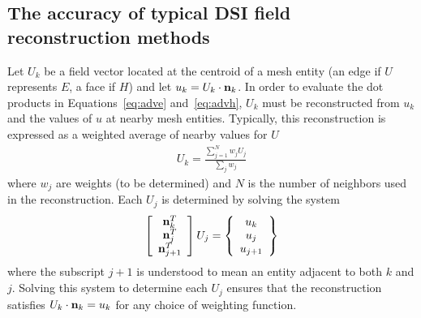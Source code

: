 \documentclass[12pt]{article}
\begin{document}
\subsection{The accuracy of typical DSI field reconstruction methods}
Let $U_k$ be a field vector located at the centroid of a mesh entity
(an edge if $U$ represents $E$, a face if $H$) and let $u_k=U_k\cdot{\bf
n}_k$.  In order to evaluate the dot products in
Equations~\ref{eq:adve} and~\ref{eq:advh}, $U_k$ must be reconstructed
from $u_k$ and the values of $u$ at nearby mesh entities.  Typically, this reconstruction
is expressed as a weighted average of nearby values for $U$ ~\cite{madsen,gedney}
\begin{eqnarray}
U_k = \frac{\sum_{j=1}^N w_j U_j}{\sum_j w_j}\label{eq:oldr}
\end{eqnarray}
where $w_j$ are weights (to be determined) and $N$ is the number of
neighbors used in the reconstruction.  Each $U_j$ is determined by solving
the system
\begin{eqnarray*}
\left[\begin{array}{c} {\bf n}_k^T\\
                {\bf n}_j^T\\
		{\bf n}_{j+1}^T\end{array}\right]U_j = \left\{\begin{array}{c}u_k\\u_j\\u_{j+1}\end{array}\right\}\\
\end{eqnarray*}
where the subscript $j+1$ is understood to mean an entity adjacent to both 
$k$ and $j$.  Solving this system to determine each $U_j$ ensures that
the reconstruction satisfies $U_k\cdot{\bf n}_k=u_k$ for any choice of 
weighting function.  
\end{document}
